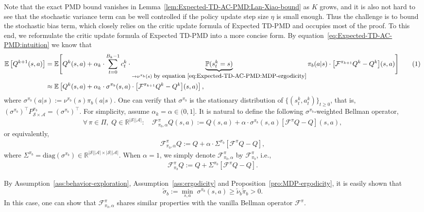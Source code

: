 \documentclass[10pt]{article}
\newcommand{\calA}{\mathcal{A}}
\newcommand{\calS}{\mathcal{S}}
\newcommand{\calF}{\mathcal{F}}
\newcommand{\E}{\mathbb{E}}
\renewcommand{\P}{\mathbb{P}}
\newcommand{\ls}{\left}
\newcommand{\rs}{\right}
\newcommand\numberthis{\addtocounter{equation}{1}\tag{\theequation}}
\theoremstyle{plain}
\theoremstyle{definition}
\begin{document}
Note that the exact PMD bound vanishes in Lemma~\ref{lem:Expected-TD-AC-PMD:Lan-Xiao-bound} as $K$ grows, and it is also not hard to see that the stochastic variance term can be well controlled if the policy update step size $\eta$ is small enough. Thus the challenge is  to bound the stochastic bias term, which closely relies on the critic update formula of Expected TD-PMD and occupies most of the proof. To this end, we reformulate the critic update formula of Expected TD-PMD into a more concise form. By equation~\eqref{eq:Expected-TD-AC-PMD:intuition} we know that
\begin{align*}
    \E\ls[ Q^{k+1}(s,a) \rs] &= \E\Bigg[ Q^k(s,a) + \alpha_k\cdot \sum_{t=0}^{B_k-1} c_t^k \cdot \underbrace{\P(s_t^k=s)}_{\to \nu^{\pi_b}(s) \mbox{\small \;by equation~\eqref{eq:Expected-TD-AC-PMD:MDP-ergodicity}}} \pi_b(a|s) \cdot {\ls[ \calF^{\pi_{k+1}} Q^k - Q^k \rs]}(s,a) \Bigg] \numberthis \label{eq:Expected-TD-AC-PMD:intuition-2} \\
    &\approx \E\ls[ Q^k(s,a) + \alpha_k\cdot {\sigma^{\pi_b}(s,a)} \cdot {\ls[ \calF^{\pi_{k+1}} Q^k - Q^k \rs]}(s,a) \rs],
\end{align*}
where $\sigma^{\pi_b}(a|s) := \nu^{\pi_b}(s) \pi_b(a|s)$. One can verify that $\sigma^{\pi_b}$ is the stationary distribution of $\{ (s^k_t, a^k_t) \}_{t\geq0}$, that is, $(\sigma^{\pi_b})^\top P^{\pi_b}_{\scriptscriptstyle \calS\times\calA} = (\sigma^{\pi_b})^\top$. For simplicity, assume $\alpha_k=\alpha\in(0,1]$. It is natural to define the following $\sigma^{\pi_b}$-weighted Bellman operator,
\begin{align*}
    \forall\, \pi \in \Pi, \; Q\in\mathbb{R}^{|\calS||\calA|}: \quad \calF^{\pi}_{\pi_b,\alpha} Q(s,a) := Q(s,a) + \alpha\cdot\sigma^{\pi_b}(s,a) \ls[ \calF^{\pi} Q - Q \rs](s,a),
\end{align*}
or equivalently,
\begin{align*}
    \calF^{\pi}_{\pi_b,\alpha} Q := Q + \alpha\cdot\Sigma^{\pi_b} \ls[ \calF^\pi Q - Q \rs],
\end{align*}
where $\Sigma^{\pi_b} = \mbox{diag}(\sigma^{\pi_b}) \in \mathbb{R}^{|\calS||\calA| \times |\calS||\calA|}$. When $\alpha=1$, we simply denote $\calF^{\pi}_{\pi_b,\alpha}$ by $\calF^{\pi}_{\pi_b}$, i.e., 
\begin{align*}
    \calF^{\pi}_{\pi_b} Q := Q + \Sigma^{\pi_b} \ls[ \calF^\pi Q - Q \rs].
\end{align*}

By Assumption~\ref{ass:behavior-exploration}, Assumption~\ref{ass:ergodicity} and Proposition~\ref{pro:MDP-ergodicity}, it is easily shown that 
\[\tilde\sigma_{b} := \min_{s,a} \; \sigma^{\pi_b}(s,a) \geq \tilde\nu_b \tilde\pi_b > 0.\]
In this case, one can show that $\calF^{\pi}_{\pi_b,\alpha}$ shares similar properties with the vanilla Bellman operator $\calF^\pi$.
\end{document}
